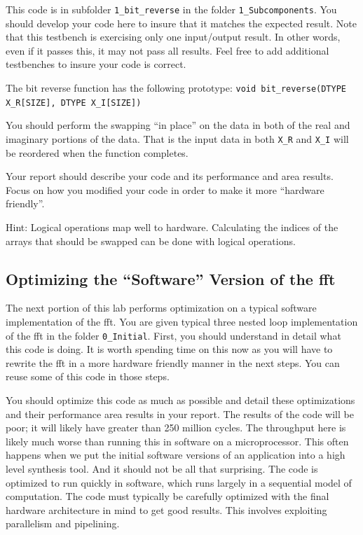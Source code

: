 This code is in subfolder \texttt{1\_bit\_reverse} in the folder \texttt{1\_Subcomponents}. You should develop your code here to insure that it matches the expected result. Note that this testbench is exercising only one input/output result. In other words, even if it passes this, it may not pass all results. Feel free to add additional testbenches to insure your code is correct.

The bit reverse function has the following prototype: \texttt{void bit\_reverse(DTYPE X\_R[SIZE], DTYPE X\_I[SIZE])}

You should perform the swapping ``in place'' on the data in both of the real and imaginary portions of the data. That is the input data in both \texttt{X\_R} and \texttt{X\_I} will be reordered when the function completes.

Your report should describe your code and its performance and area results. Focus on how you modified your code in order to make it more ``hardware friendly''.

Hint: Logical operations map well to hardware. Calculating the indices of the arrays that should be swapped can be done with logical operations. 

\subsection{Optimizing the ``Software'' Version of the \gls{fft}}
The next portion of this lab performs optimization on a typical software implementation of the \gls{fft}. You are given typical three nested loop implementation of the \gls{fft} in the folder \texttt{0\_Initial}. First, you should understand in detail what this code is doing. It is worth spending time on this now as you will have to rewrite the \gls{fft} in a more hardware friendly manner in the next steps. You can reuse some of this code in those steps.

You should optimize this code as much as possible and detail these optimizations and their performance area results in your report. The results of the code will be poor; it will likely have greater than 250 million cycles. The throughput here is likely much worse than running this in software on a microprocessor. This often happens when we put the initial software versions of an application into a high level synthesis tool. And it should not be all that surprising. The code is optimized to run quickly in software, which runs largely in a sequential model of computation. The code must typically be carefully optimized with the final hardware architecture in mind to get good results. This involves exploiting parallelism and pipelining.

